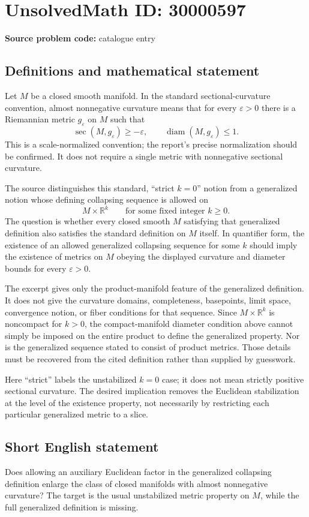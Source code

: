 \documentclass[11pt]{article}
\newcommand{\R}{\mathbb{R}}
\begin{document}
\section*{UnsolvedMath ID: 30000597}
\textbf{Source problem code:} catalogue entry
\subsection{Definitions and mathematical statement}
Let $M$ be a closed smooth manifold. In the standard sectional-curvature convention, almost nonnegative curvature means that for every $\varepsilon>0$ there is a Riemannian metric $g_\varepsilon$ on $M$ such that
\[
 \sec(M,g_\varepsilon)\ge-\varepsilon,
 \qquad\operatorname{diam}(M,g_\varepsilon)\le1.
\]
This is a scale-normalized convention; the report's precise normalization should be confirmed. It does not require a single metric with nonnegative sectional curvature.

The source distinguishes this standard, ``strict $k=0$'' notion from a generalized notion whose defining collapsing sequence is allowed on
\[
 M\times\R^k\qquad\text{for some fixed integer }k\ge0.
\]
The question is whether every closed smooth $M$ satisfying that generalized definition also satisfies the standard definition on $M$ itself. In quantifier form, the existence of an allowed generalized collapsing sequence for some $k$ should imply the existence of metrics on $M$ obeying the displayed curvature and diameter bounds for every $\varepsilon>0$.

The excerpt gives only the product-manifold feature of the generalized definition. It does not give the curvature domains, completeness, basepoints, limit space, convergence notion, or fiber conditions for that sequence. Since $M\times\R^k$ is noncompact for $k>0$, the compact-manifold diameter condition above cannot simply be imposed on the entire product to define the generalized property. Nor is the generalized sequence stated to consist of product metrics. Those details must be recovered from the cited definition rather than supplied by guesswork.

Here ``strict'' labels the unstabilized $k=0$ case; it does not mean strictly positive sectional curvature. The desired implication removes the Euclidean stabilization at the level of the existence property, not necessarily by restricting each particular generalized metric to a slice.
\subsection{Short English statement}
Does allowing an auxiliary Euclidean factor in the generalized collapsing definition enlarge the class of closed manifolds with almost nonnegative curvature? The target is the usual unstabilized metric property on $M$, while the full generalized definition is missing.
\end{document}

